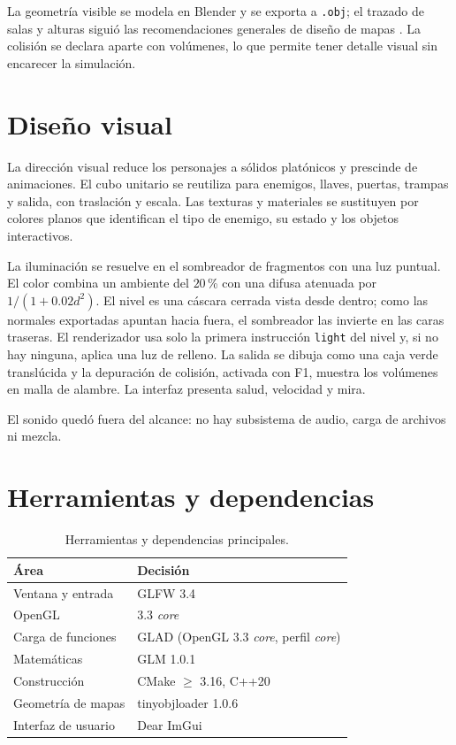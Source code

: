 \documentclass[12pt,a4paper]{article}
\begin{document}
La geometría visible se modela en Blender y se exporta a \texttt{.obj}; el
trazado de salas y alturas siguió las recomendaciones generales de diseño de
mapas \cite{map}. La colisión se declara aparte con volúmenes, lo que permite
tener detalle visual sin encarecer la simulación.

\section{Diseño visual}

La dirección visual reduce los personajes a sólidos platónicos y prescinde de
animaciones. El cubo unitario se reutiliza para enemigos, llaves, puertas,
trampas y salida, con traslación y escala. Las texturas y materiales se
sustituyen por colores planos que identifican el tipo de enemigo, su estado y
los objetos interactivos.

La iluminación se resuelve en el sombreador de fragmentos con una luz puntual.
El color combina un ambiente del $20$\,\% con una difusa atenuada por
$1/(1+0.02d^2)$. El nivel es una cáscara cerrada vista desde dentro; como las
normales exportadas apuntan hacia fuera, el sombreador las invierte en las caras
traseras. El renderizador usa solo la primera instrucción \texttt{light} del
nivel y, si no hay ninguna, aplica una luz de relleno. La salida se dibuja como
una caja verde translúcida y la depuración de colisión, activada con F1, muestra
los volúmenes en malla de alambre. La interfaz presenta salud, velocidad y mira.

El sonido quedó fuera del alcance: no hay subsistema de audio, carga de archivos
ni mezcla.

\section{Herramientas y dependencias}

\begin{table}[htbp]
  \centering
  \small
  \begin{tabular}{@{}ll@{}}
    \toprule
    Área & Decisión \\
    \midrule
    Ventana y entrada & GLFW 3.4 \\
    OpenGL & 3.3 \emph{core} \\
    Carga de funciones & GLAD (OpenGL 3.3 \emph{core}, perfil \emph{core}) \\
    Matemáticas & GLM 1.0.1 \\
    Construcción & CMake $\geq$ 3.16, C++20 \\
    Geometría de mapas & tinyobjloader 1.0.6 \\
    Interfaz de usuario & Dear ImGui \\
    \bottomrule
  \end{tabular}
  \caption{Herramientas y dependencias principales.}
  \label{tab:herramientas}
\end{table}
\end{document}
